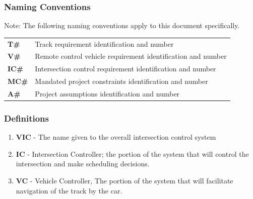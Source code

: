 \documentclass [11pt]{article}
\begin{document}
\subsubsection{Naming Conventions}
Note: The following naming conventions apply to this document specifically. 
\begin{longtable}{ |p{ }  p{ }|}  \hline
\textbf{T\#} &  Track requirement identification  and number \\ 

\cellcolor{tableCell}\textbf{V\#}  & \cellcolor{tableCell}Remote control vehicle requirement identification  and number \\ 

\textbf{IC\#} & Intersection control requirement identification  and number \\ 

\cellcolor{tableCell}\textbf{MC\#} &  \cellcolor{tableCell}Mandated project constraints identification and number \\ 



\textbf{A\#} & Project assumptions identification and number \\ \hline

\end{longtable}
%

\subsubsection{Definitions}
\begin{enumerate}
	\itemsep0pt
	\item \textbf{VIC} - The name given to the overall intersection control system
	\item \textbf{IC} - Intersection Controller; the portion of the system that will control the intersection and make scheduling decisions. 
	\item \textbf{VC} - Vehicle Controller, The portion of the system that will facilitate navigation of the track by the car. 
\end{enumerate}
\end{document}
